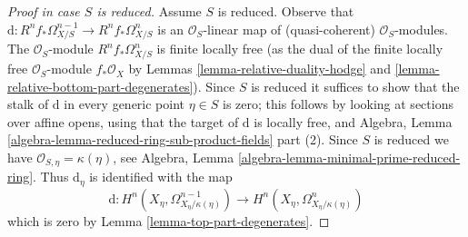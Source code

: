 \begin{proof}[Proof in case $S$ is reduced]
Assume $S$ is reduced. Observe that
$\text{d} : R^nf_*\Omega^{n - 1}_{X/S} \to R^nf_*\Omega^n_{X/S}$
is an $\mathcal{O}_S$-linear map of (quasi-coherent) $\mathcal{O}_S$-modules.
The $\mathcal{O}_S$-module $R^nf_*\Omega^n_{X/S}$ is finite locally free
(as the dual of the finite locally free $\mathcal{O}_S$-module
$f_*\mathcal{O}_X$ by Lemmas
\ref{lemma-relative-duality-hodge} and
\ref{lemma-relative-bottom-part-degenerates}).
Since $S$ is reduced it suffices to show that
the stalk of $\text{d}$ in every generic point $\eta \in S$
is zero; this follows by looking at sections over affine opens,
using that the target of $\text{d}$ is locally free, and
Algebra, Lemma \ref{algebra-lemma-reduced-ring-sub-product-fields} part (2).
Since $S$ is reduced we have $\mathcal{O}_{S, \eta} = \kappa(\eta)$, see
Algebra, Lemma \ref{algebra-lemma-minimal-prime-reduced-ring}.
Thus $\text{d}_\eta$ is identified with the map
$$
\text{d} :
H^n(X_\eta, \Omega^{n - 1}_{X_\eta/\kappa(\eta)})
\longrightarrow
H^n(X_\eta, \Omega^n_{X_\eta/\kappa(\eta)})
$$
which is zero by Lemma \ref{lemma-top-part-degenerates}.
\end{proof}

